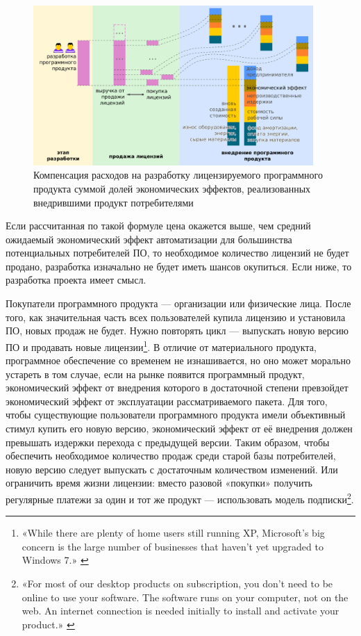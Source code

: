 \documentclass{article}
\begin{document}
\begin{figure}[h]
    \centering
    \includegraphics[width=0.95\textwidth]{model-eco-effect-license}
    \caption{Компенсация расходов на разработку лицензируемого программного продукта суммой долей экономических эффектов, реализованных внедрившими продукт потребителями}
    \label{fig:model_eco_effect_license}
\end{figure}

Если рассчитанная по такой формуле цена окажется выше, чем средний ожидаемый экономический эффект автоматизации для большинства потенциальных потребителей ПО, то необходимое количество лицензий не будет продано, разработка изначально не будет иметь шансов окупиться. Если ниже, то разработка проекта имеет смысл.

Покупатели программного продукта — организации или физические лица. После того, как значительная часть всех пользователей купила лицензию и установила ПО, новых продаж не будет. Нужно повторять цикл — выпускать новую версию ПО и продавать новые лицензии\footnote{«While there are plenty of home users still running XP, Microsoft’s big concern is the large number of businesses that haven’t yet upgraded to Windows 7.» \cite{windowsXPLegacy}}. В отличие от материального продукта, программное обеспечение со временем не изнашивается, но оно может морально устареть в том случае, если на рынке появится программный продукт, экономический эффект от внедрения которого в достаточной степени превзойдет экономический эффект от эксплуатации рассматриваемого пакета. Для того, чтобы существующие пользователи программного продукта имели объективный стимул купить его новую версию, экономический эффект от её внедрения должен превышать издержки перехода с предыдущей версии. Таким образом, чтобы обеспечить необходимое количество продаж среди старой базы потребителей, новую версию следует выпускать с достаточным количеством изменений. Или ограничить время жизни лицензии: вместо разовой «покупки» получить регулярные платежи за один и тот же продукт — использовать модель подписки\footnote{«For most of our desktop products on subscription, you don't need to be online to use your software. The software runs on your computer, not on the web. An internet connection is needed initially to install and activate your product.» \cite{autodeskSubscription}}.
\end{document}
